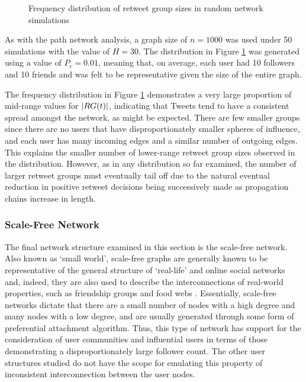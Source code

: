 \begin{figure}[h]
\centering
{}
\caption{Frequency distribution of retweet group sizes in random network simulations}
\label{fig:random}
\end{figure}

As with the path network analysis, a graph size of $n = 1000$ was used under 50 simulations with the value of $H = 30$. The distribution in Figure \ref{fig:random} was generated using a value of $P_c = 0.01$, meaning that, on average, each user had 10 followers and 10 friends and was felt to be representative given the size of the entire graph.

The frequency distribution in Figure \ref{fig:random} demonstrates a very large proportion of mid-range values for $|RG(t)|$, indicating that Tweets tend to have a consistent spread amongst the network, as might be expected. There are few smaller groups since there are no users that have disproportionately smaller spheres of influence, and each user has many incoming edges and a similar number of outgoing edges. This explains the smaller number of lower-range retweet group sizes observed in the distribution. However, as in any distribution so far examined, the number of larger retweet groups must eventually tail off due to the natural eventual reduction in positive retweet decisions being successively made as propagation chains increase in length.


\subsubsection{Scale-Free Network}
The final network structure examined in this section is the scale-free network. Also known as `small world', scale-free graphs are generally known to be representative of the general structure of `real-life' and online social networks \cite{mislove07} and, indeed, they are also used to describe the interconnections of real-world properties, such as friendship groups and food webs \cite{guido07} \cite{hein06}. Essentially, scale-free networks dictate that there are a small number of nodes with a high degree and many nodes with a low degree, and are usually generated through some form of preferential attachment algorithm. Thus, this type of network has support for the consideration of user communities and influential users in terms of those demonstrating a disproportionately large follower count. The other user structures studied do not have the scope for emulating this property of inconsistent interconnection between the user nodes.

